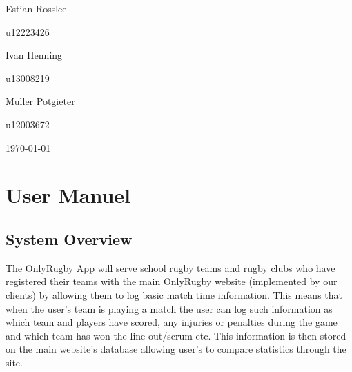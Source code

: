 \documentclass[hidelinks,a4paper,12pt]{article}
\begin{document}
\begin{titlepage}
\begin{center}
\begin{minipage}{0.4\textwidth}
\begin{flushleft} \large
Estian {Rosslee}
\end{flushleft}
\end{minipage}
\begin{minipage}{0.4\textwidth}
\begin{flushright} \large
\emph{}
u12223426
\end{flushright}
\end{minipage}

\begin{minipage}{0.4\textwidth}
\begin{flushleft} \large
Ivan {Henning}
\end{flushleft}
\end{minipage}
\begin{minipage}{0.4\textwidth}
\begin{flushright} \large
\emph{}
u13008219
\end{flushright}
\end{minipage}

\begin{minipage}{0.4\textwidth}
\begin{flushleft} \large
Muller {Potgieter}
\end{flushleft}
\end{minipage}
\begin{minipage}{0.4\textwidth}
\begin{flushright} \large
\emph{}
u12003672
\end{flushright}
\end{minipage}

\vfill
{\large \today}
\end{center}
\end{titlepage}
\footnotesize
%
\normalsize


\tableofcontents
\newpage
{}

\newpage
\section{User Manuel}
\subsection{System Overview} 
The OnlyRugby App will serve school rugby teams and rugby clubs who have registered their teams with the main OnlyRugby website (implemented by our clients) by allowing them to log basic match time information. This means that when the user's team is playing a match the user can log such information as which team and players have scored, any injuries or penalties during the game and which team has won the line-out/scrum etc. This information is then stored on the main website's database allowing user's to compare statistics through the site.
\end{document}
